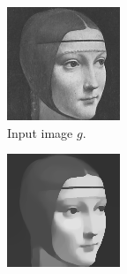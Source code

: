 \documentclass[abstracton]{scrreprt}
\begin{document}
            \begin{figure}[!ht]
                \centering
                \begin{subfigure}[b]{0.32\textwidth}
                    \includegraphics[width=\textwidth]{img/images/ladama.png}
                    \caption{Input image $g$.}
                \end{subfigure}
                \begin{subfigure}[b]{0.32\textwidth}
                    \includegraphics[width=\textwidth]{img/dykstra/ladama.png}

\end{subfigure}
\end{figure}
\end{document}
